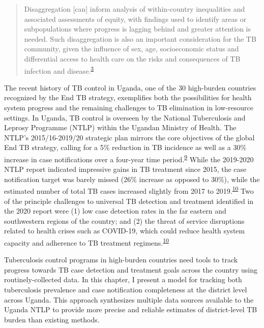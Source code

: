 \documentclass[
]{article}
\begin{document}
\begin{quote}
Disaggregation {[}can{]} inform analysis of within-country inequalities and associated assessments of equity, with findings used to identify areas or subpopulations where progress is lagging behind and greater attention is needed. Such disaggregation is also an important consideration for the TB community, given the influence of sex, age, socioeconomic status and differential access to health care on the risks and consequences of TB infection and disease.\textsuperscript{\protect\hyperlink{ref-WorldHealthOrganization2020a}{3}}
\end{quote}

The recent history of TB control in Uganda, one of the 30 high-burden countries recognized by the End TB strategy, exemplifies both the possibilities for health system progress and the remaining challenges to TB elimination in low-resource settings. In Uganda, TB control is overseen by the National Tuberculosis and Leprosy Programme (NTLP) within the Ugandan Ministry of Health. The NTLP's 2015/16-2019/20 strategic plan mirrors the core objectives of the global End TB strategy, calling for a 5\% reduction in TB incidence as well as a 30\% increase in case notifications over a four-year time period.\textsuperscript{\protect\hyperlink{ref-UgandaNationalTuberculosisandLeprosyProgramme2017a}{9}} While the 2019-2020 NTLP report indicated impressive gains in TB treatment since 2015, the case notification target was barely missed (26\% increase as opposed to 30\%), while the estimated number of total TB cases increased slightly from 2017 to 2019.\textsuperscript{\protect\hyperlink{ref-UgandaNationalTuberculosisandLeprosyProgramme2020}{10}} Two of the principle challenges to universal TB detection and treatment identified in the 2020 report were (1) low case detection rates in the far eastern and southwestern regions of the country; and (2) the threat of service disruptions related to health crises such as COVID-19, which could reduce health system capacity and adherence to TB treatment regimens.\textsuperscript{\protect\hyperlink{ref-UgandaNationalTuberculosisandLeprosyProgramme2020}{10}}

Tuberculosis control programs in high-burden countries need tools to track progress towards TB case detection and treatment goals across the country using routinely-collected data. In this chapter, I present a model for tracking both tuberculosis prevalence and case notification completeness at the district level across Uganda. This approach synthesizes multiple data sources available to the Uganda NTLP to provide more precise and reliable estimates of district-level TB burden than existing methods.
\end{document}
